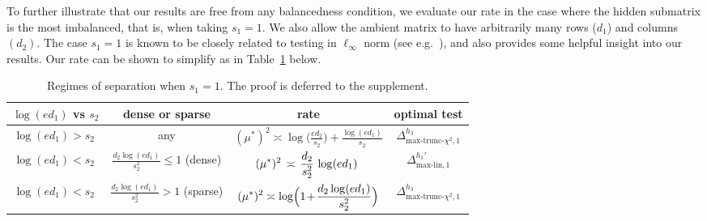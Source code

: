 \documentclass{article}
\newcommand{\maxlin}{\text{max-lin}}
\newcommand{\chisqmax}{\text{max-trunc-$\chi^2$}}
\theoremstyle{remark}
\begin{document}
To further illustrate that our results are free from any balancedness condition, we evaluate our rate in the case where the hidden submatrix is the most imbalanced, that is, when taking $s_1 = 1$. 
We also allow the ambient matrix to have arbitrarily many rows ($d_1$) and columns $(d_2)$. 
The case $s_1 = 1$ is known to be closely related to testing in $\ell_\infty$ norm (see e.g.~\cite{chhor2024sparse,kotekal2026locally}), and also provides some helpful insight into our results. 
Our rate can be shown to simplify as in Table~\ref{table_s1=1} below.
\begin{table}[h]
\centering
\begin{tabular}{|c|c|c|c|}
\hline
\textbf{ $\log (ed_1)$ vs $s_2$ } & \textbf{dense or sparse} & \textbf{rate} & \textbf{ optimal test } \\ \hline
$\log (ed_1) > s_2 \phantom{\Bigg|}$ & any & $\displaystyle(\mu^*)^2\asymp\log\Big(\frac{ed_2}{s_2}\Big) + \frac{\log(ed_1)}{s_2}$ & $\Delta_{\chisqmax, 1}^{h_3}$ \\ \hline
$\log (ed_1) < s_2\phantom{\Bigg|}$ & $\displaystyle\frac{d_2 \log (ed_1)}{s_2^2} \leq 1$ (dense) & $\displaystyle \hspace{-1mm}(\mu^*)^2 \, \asymp \, \frac{d_2}{s_2^2} \, \log (ed_1)$ & $\Delta^{h_1'}_{\maxlin, 1}$ \\
\hline
$\log (ed_1) < s_2\phantom{\Bigg|}$ & $\displaystyle\frac{d_2 \log (ed_1)}{s_2^2} > 1$ (sparse) & $\displaystyle(\mu^*)^2\asymp\log\!\Big(1\hspace{-.5mm}+\hspace{-.5mm} \frac{d_2\log(ed_1)}{s_2^2}\Big)$ & $\Delta_{\chisqmax, 1}^{h_3}$ \\ \hline
\end{tabular}
\caption{Regimes of separation when $s_1 = 1$. The proof is deferred to the supplement.}
\label{table_s1=1}
\end{table}
\end{document}
